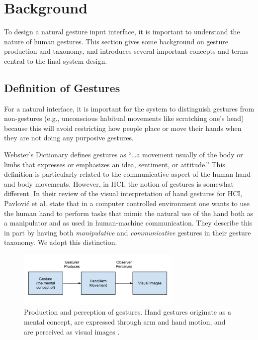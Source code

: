 \section{Background}
To design a natural gesture input interface, it is important to understand the
nature of human gestures. This section gives some background on
gesture production and taxonomy, and introduces several important concepts and
terms central to the final system design.
 
\subsection{Definition of Gestures}
For a natural
interface, it is important for the system to distinguish gestures from
non-gestures (e.g., unconscious habitual movements like scratching one's head)
because this will avoid restricting how people place or move their hands when
they are not doing any purposive gestures.

Webster's Dictionary defines gestures as ``\ldots a movement usually of the body or limbs
that expresses or emphasizes an idea, sentiment, or attitude.'' This definition
is particularly related to the communicative aspect of the human hand and body
movements. However, in HCI, the notion
of gestures is somewhat different. In their review of the visual interpretation
of hand gestures for HCI, Pavlovi\'{c} et al. \cite{Pavlovic97} state that in a
computer controlled environment one wants to use the human hand to perform tasks that
mimic the natural use of the hand both as a manipulator and as used in
human-machine communication. They describe this in part by having both
\textit{manipulative} and \textit{communicative} gestures in their gesture taxonomy. We adopt this
distinction.

\begin{figure}[tbh]
  \centering
  \includegraphics[width=0.7\textwidth]{figures/gesture_production.png} 
  \caption{Production and perception of gestures. Hand gestures originate as a
  mental concept, are expressed through arm and hand motion, and are perceived
  as visual images \cite{Pavlovic97}.}
  \label{fig:gesture_production}
\end{figure}

